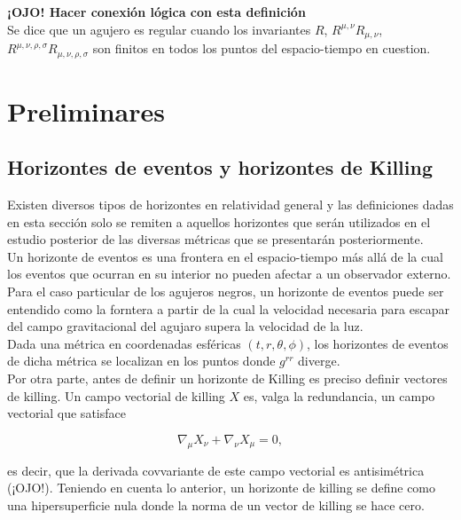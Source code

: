 \documentclass[prb,aps,preprintnumbers,amsmath,amssymb]{article}
\numberwithin{equation}{section}
\begin{document}
\textbf{¡OJO! Hacer conexión lógica con esta definición}\\

Se dice que un agujero es regular cuando los invariantes $R$, $R^{\mu,\nu}R_{\mu,\nu}$, $R^{\mu,\nu,\rho,\sigma}R_{\mu,\nu,\rho,\sigma}$ son finitos en todos los puntos del espacio-tiempo en cuestion.
 
\section{Preliminares}

\subsection{Horizontes de eventos y horizontes de Killing}

Existen diversos tipos de horizontes en relatividad general y las definiciones dadas en esta sección solo se remiten a aquellos horizontes que serán utilizados en el estudio posterior de las diversas métricas que se presentarán posteriormente.\\

Un horizonte de eventos es una frontera en el espacio-tiempo más allá de la cual los eventos que ocurran en su interior no pueden afectar a un observador externo. Para el caso particular de los agujeros negros, un horizonte de eventos puede ser entendido como la forntera a partir de la cual la velocidad necesaria para escapar del campo gravitacional del agujaro supera la velocidad de la luz.\\

Dada una métrica en coordenadas esféricas $(t,r,\theta,\phi)$, los horizontes de eventos de dicha métrica se localizan en los puntos donde $g^{rr}$ diverge.\\

Por otra parte, antes de definir un horizonte de Killing es preciso definir vectores de killing. Un campo vectorial de killing $X$ es, valga la redundancia, un campo vectorial que satisface

\begin{equation}
\nabla_\mu X_\nu + \nabla_\nu X_\mu = 0,
\end{equation}

es decir, que la derivada covvariante de este campo vectorial es antisimétrica (¡OJO!). Teniendo en cuenta lo anterior, un horizonte de killing se define como una hipersuperficie nula donde la norma de un vector de killing se hace cero.
\end{document}
